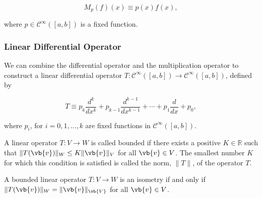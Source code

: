 \documentclass[a4paper,12pt]{report}
\begin{document}
\begin{equation}
    M_{p}(f)(x) \equiv p(x)f(x), 
\end{equation}

where \(p \in \mathcal{C}^{\infty}([a,b]) \) is a fixed function. 

\subsubsection{Linear Differential Operator}

We can combine the differential operator and the multiplication operator to construct a linear differential operator \(T:\mathcal{C}^{\infty}([a,b]) \to \mathcal{C}^{\infty}([a,b])  \), defined by 

\begin{equation}
    T \equiv p_{k} \frac{d^{k} }{dx^{k} } + p_{k-1} \frac{d^{k-1}}{dx^{k-1} } + \cdots + p_1 \frac{d}{dx} + p_0 ,    
\end{equation}

where \(p_{i} \), for \(i = 0, 1, \ldots ,k\) are fixed functions in \(\mathcal{C}^{\infty}([a,b]) \).    

\begin{definition}
    A linear operator \(T:V \to W\) is called bounded if there exists a positive \(K \in \mathbb{R}\) such that \(\lVert T(\vb{v} ) \rVert_{W} \le K \lVert \vb{v}  \rVert_{V}    \) for all \(\vb{v} \in V\). The smallest number \(K\) for which this condition is satisfied is called the norm, \(\lVert T \rVert \), of the operator \(T\).    
\end{definition}

\begin{definition}[Isometries]
    A bounded linear operator \(T:V \to W\) is an isometry if and only if \(\lVert T(\vb{v} ) \rVert_{W} = \lVert \vb{v}  \rVert_{\vb{V} } \) for all \(\vb{v} \in V\).   
\end{definition}
\end{document}
